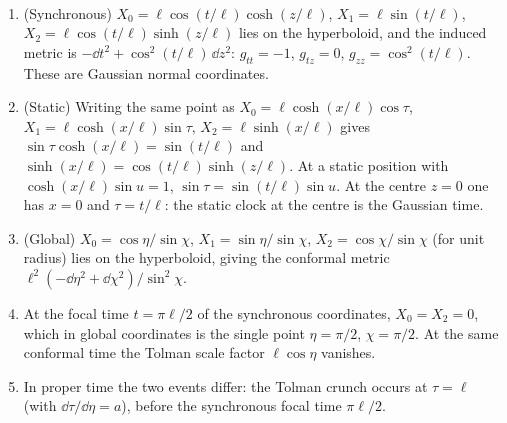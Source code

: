 \begin{proposition}\label{prop:clocks}\ver\
\begin{enumerate}[label=(\roman*)]
\item (Synchronous) $X_0=\ell\cos(t/\ell)\cosh(z/\ell)$, $X_1=\ell\sin(t/\ell)$, $X_2=\ell\cos(t/\ell)\sinh(z/\ell)$ lies on the hyperboloid, and the induced metric is $-\dd t^2+\cos^2(t/\ell)\,\dd z^2$: $g_{tt}=-1$, $g_{tz}=0$, $g_{zz}=\cos^2(t/\ell)$. These are Gaussian normal coordinates.
\item (Static) Writing the same point as $X_0=\ell\cosh(x/\ell)\cos\tau$, $X_1=\ell\cosh(x/\ell)\sin\tau$, $X_2=\ell\sinh(x/\ell)$ gives $\sin\tau\cosh(x/\ell)=\sin(t/\ell)$ and $\sinh(x/\ell)=\cos(t/\ell)\sinh(z/\ell)$. At a static position with $\cosh(x/\ell)\sin u=1$, $\sin\tau=\sin(t/\ell)\sin u$. At the centre $z=0$ one has $x=0$ and $\tau=t/\ell$: the static clock at the centre is the Gaussian time.
\item (Global) $X_0=\cos\eta/\sin\chi$, $X_1=\sin\eta/\sin\chi$, $X_2=\cos\chi/\sin\chi$ (for unit radius) lies on the hyperboloid, giving the conformal metric $\ell^2(-\dd\eta^2+\dd\chi^2)/\sin^2\chi$.
\item At the focal time $t=\pi\ell/2$ of the synchronous coordinates, $X_0=X_2=0$, which in global coordinates is the single point $\eta=\pi/2$, $\chi=\pi/2$. At the same conformal time the Tolman scale factor $\ell\cos\eta$ vanishes.
\item In proper time the two events differ: the Tolman crunch occurs at $\tau=\ell$ (with $\dd\tau/\dd\eta=a$), before the synchronous focal time $\pi\ell/2$.
\end{enumerate}
\end{proposition}
